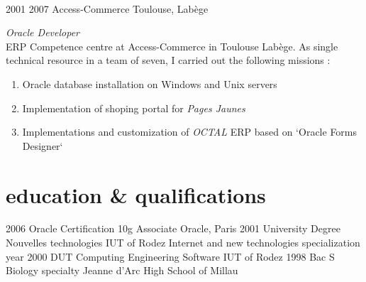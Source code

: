 \documentclass{friggeri-cv} 	%
\begin{document}
\begin{entrylist}
{\begin{enumerate}
\end{enumerate}
\
}

\entry
{2001  2007}
{Access-Commerce}
{Toulouse, Labège}
{\vspace{0.2cm}\emph{Oracle Developer}  \\
ERP Competence centre at Access-Commerce in Toulouse Labège.
As single technical resource in a team of seven, I carried out the following missions :
\begin{enumerate}
	\item Oracle database installation on Windows and Unix servers
	\item Implementation of shoping portal for \textit{Pages Jaunes}
	\item Implementations and customization of \textit{OCTAL} ERP based on `Oracle Forms Designer`
\end{enumerate}
}
\end{entrylist}
\newpage


\section{education \& qualifications}

\begin{entrylist}
\entry
{2006}
{Oracle Certification {\normalfont 10g Associate}}
{Oracle, Paris}
{}
\entry
{2001}
{University Degree {\normalfont Nouvelles technologies}}
{IUT of Rodez}
{Internet and new technologies specialization year}
\entry
{2000}
{DUT {\normalfont Computing Engineering Software}}
{IUT of Rodez}
{}
\entry
{1998}
{Bac S {\normalfont Biology specialty}}
{Jeanne d’Arc High School of Millau}
{}
\end{entrylist}

\end{document}
